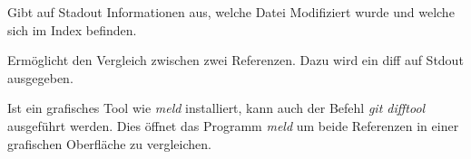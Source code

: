 \label{sec:git-commands.advanced.status}
Gibt auf Stadout Informationen aus, welche Datei Modifiziert wurde und welche sich im Index befinden.

\label{sec:git-commands.advanced.diff}
Ermöglicht den Vergleich zwischen zwei Referenzen. Dazu wird ein diff auf Stdout ausgegeben.

\begin{info-popup}
  Ist ein grafisches Tool wie \textit{meld} installiert, kann auch der Befehl \textit{git difftool} ausgeführt werden. Dies öffnet das Programm \textit{meld} um beide Referenzen in einer grafischen Oberfläche zu vergleichen.
\end{info-popup}
